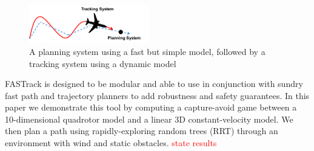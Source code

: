 \begin{figure}
	\centering
	\includegraphics[width=0.47\textwidth]{fig/chasing}
	\caption{A planning system using a fast but simple model, followed by a tracking system using a dynamic model}
	\label{fig:chasing}
\end{figure}
%
FASTrack is designed to be modular and able to use in conjunction with sundry fast path and trajectory planners to add robustness and safety guarantees. In this paper we demonstrate this tool by computing a capture-avoid game between a 10-dimensional quadrotor model and a linear 3D constant-velocity model. We then plan a path using rapidly-exploring random trees (RRT) through an environment with wind and static obstacles. \textcolor{red}{state results}